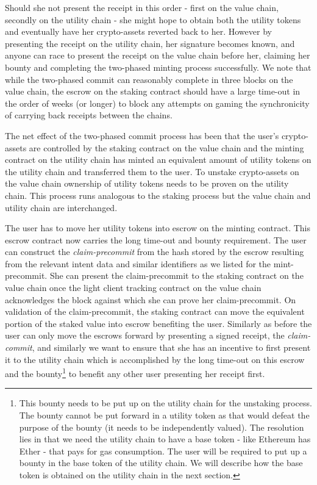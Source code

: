 \documentclass[12pt,a4paper, twocolumn]{article}
\begin{document}
Should she not present the receipt in this order - first on the value chain, secondly on the utility chain - she might hope to obtain both the utility tokens and eventually have her crypto-assets reverted back to her.  However by presenting the receipt on the utility chain, her signature becomes known, and anyone can race to present the receipt on the value chain before her, claiming her bounty and completing the two-phased minting process successfully.  We note that while the two-phased commit can reasonably complete in three blocks on the value chain, the escrow on the staking contract should have a large time-out in the order of weeks (or longer) to block any attempts on gaming the synchronicity of carrying back receipts between the chains. \par
The net effect of the two-phased commit process has been that the user’s crypto-assets are controlled by the staking contract on the value chain and the minting contract on the utility chain has minted an equivalent amount of utility tokens on the utility chain and transferred them to the user.
To unstake crypto-assets on the value chain ownership of utility tokens needs to be proven on the utility chain.  This process runs analogous to the staking process but the value chain and utility chain are interchanged. \par
The user has to move her utility tokens into escrow on the minting contract.  This escrow contract now carries the long time-out and bounty requirement.  The user can construct the \textit{claim-precommit} from the hash stored by the escrow resulting from the relevant intent data and similar identifiers as we listed for the mint-precommit.  She can present the claim-precommit to the staking contract on the value chain once the light client tracking contract on the value chain acknowledges the block against which she can prove her claim-precommit. On validation of the claim-precommit, the staking contract can move the equivalent portion of the staked value into escrow benefiting the user.  Similarly as before the user can only move the escrows forward by presenting a signed receipt, the \textit{claim-commit}, and similarly we want to ensure that she has an incentive to first present it to the utility chain which is accomplished by the long time-out on this escrow and the bounty\footnote{This bounty needs to be put up on the utility chain for the unstaking process.  The bounty cannot be put forward in a utility token as that would defeat the purpose of the bounty (it needs to be independently valued).  The resolution lies in that we need the utility chain to have a base token - like Ethereum has Ether - that pays for gas consumption.  The user will be required to put up a bounty in the base token of the utility chain.  We will describe how the base token is obtained on the utility chain in the next section.} to benefit any other user presenting her receipt first. \par
\end{document}
